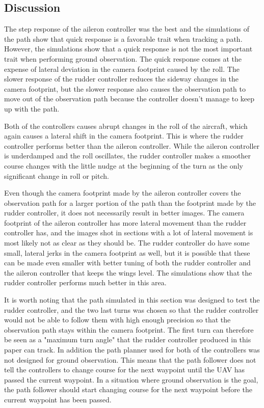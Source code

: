 \subsection{Discussion}

The step response of the aileron controller was the best and the simulations of the path show that quick response is a favorable trait when tracking a path. However, the simulations show that a quick response is not the most important trait when performing ground observation. The quick response comes at the expense of lateral deviation in the camera footprint caused by the roll. The slower response of the rudder controller reduces the sideway changes in the camera footprint, but the slower response also causes the observation path to move out of the observation path because the controller doesn't manage to keep up with the path.

Both of the controllers causes abrupt changes in the roll of the aircraft, which again causes a lateral shift in the camera footprint. This is where the rudder controller performs better than the aileron controller. While the aileron controller is underdamped and the roll oscillates, the rudder controller makes a smoother course changes with the little nudge at the beginning of the turn as the only significant change in roll or pitch.

Even though the camera footprint made by the aileron controller covers the observation path for a larger portion of the path than the footprint made by the rudder controller, it does not necessarily result in better images. The camera footprint of the aileron controller has more lateral movement than the rudder controller has, and the images shot in sections with a lot of lateral movement is most likely not as clear as they should be. The rudder controller do have some small, lateral jerks in the camera footprint as well, but it is possible that these can be made even smaller with better tuning of both the rudder controller and the aileron controller that keeps the wings level. The simulations show that the rudder controller performs much better in this area.

It is worth noting that the path simulated in this section was designed to test the rudder controller, and the two last turns was chosen so that the rudder controller would not be able to follow them with high enough precision so that the observation path stays within the camera footprint. The first turn can therefore be seen as a "maximum turn angle" that the rudder controller produced in this paper can track. In addition the path planner used for both of the controllers was not designed for ground observation. This means that the path follower does not tell the controllers to change course for the next waypoint until the UAV has passed the current waypoint. In a situation where ground observation is the goal, the path follower should start changing course for the next waypoint before the current waypoint has been passed.

